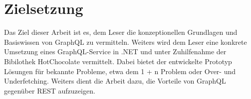 \section{Zielsetzung}
Das Ziel dieser Arbeit ist es, dem Leser die konzeptionellen Grundlagen und Basiswissen von GraphQL zu vermitteln.
Weiters wird dem Leser eine konkrete Umsetzung eines GraphQL-Service in .NET und unter Zuhilfenahme der Bibilothek HotChocolate vermittelt.
Dabei bietet der entwickelte Prototyp Lösungen für bekannte Probleme, etwa dem 1 + n Problem oder Over- und Underfetching.
Weiters dient die Arbeit dazu, die Vorteile von GraphQL gegenüber REST aufzuzeigen.
